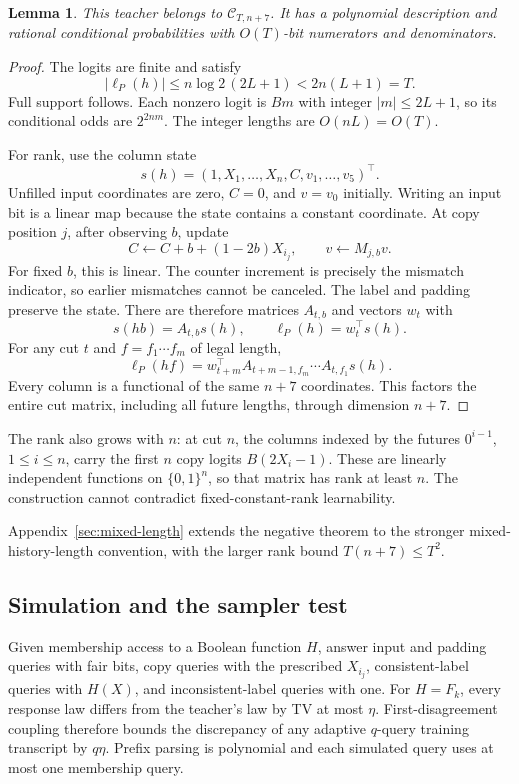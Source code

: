 \documentclass[11pt]{article}
\newtheorem{lemma}[theorem]{Lemma}
\theoremstyle{definition}
\theoremstyle{remark}
\begin{document}
\begin{lemma}\label{lem:hard-teacher}
This teacher belongs to $\mathcal C_{T,n+7}$. It has a polynomial description and rational conditional probabilities with $O(T)$-bit numerators and denominators.
\end{lemma}
\begin{proof}
The logits are finite and satisfy
\[
|\ell_P(h)|\le n\log2\,(2L+1)<2n(L+1)=T.
\]
Full support follows. Each nonzero logit is $Bm$ with integer $|m|\le2L+1$, so its conditional odds are $2^{2nm}$. The integer lengths are $O(nL)=O(T)$.

For rank, use the column state
\[
s(h)=(1,X_1,\ldots,X_n,C,v_1,\ldots,v_5)^\top.
\]
Unfilled input coordinates are zero, $C=0$, and $v=v_0$ initially. Writing an input bit is a linear map because the state contains a constant coordinate. At copy position $j$, after observing $b$, update
\begin{equation}\label{eq:counter}
C\leftarrow C+b+(1-2b)X_{i_j},
\qquad v\leftarrow M_{j,b}v.
\end{equation}
For fixed $b$, this is linear. The counter increment is precisely the mismatch indicator, so earlier mismatches cannot be canceled. The label and padding preserve the state. There are therefore matrices $A_{t,b}$ and vectors $w_t$ with
\[
s(hb)=A_{t,b}s(h),\qquad \ell_P(h)=w_t^\top s(h).
\]
For any cut $t$ and $f=f_1\cdots f_m$ of legal length,
\[
\ell_P(hf)=w_{t+m}^\top A_{t+m-1,f_m}\cdots A_{t,f_1}s(h).
\]
Every column is a functional of the same $n+7$ coordinates. This factors the entire cut matrix, including all future lengths, through dimension $n+7$.
\end{proof}

The rank also grows with $n$: at cut $n$, the columns indexed by the futures $0^{i-1}$, $1\le i\le n$, carry the first $n$ copy logits $B(2X_i-1)$. These are linearly independent functions on $\{0,1\}^n$, so that matrix has rank at least $n$. The construction cannot contradict fixed-constant-rank learnability.

Appendix~\ref{sec:mixed-length} extends the negative theorem to the stronger mixed-history-length convention, with the larger rank bound $T(n+7)\le T^2$.

\subsection{Simulation and the sampler test}

Given membership access to a Boolean function $H$, answer input and padding queries with fair bits, copy queries with the prescribed $X_{i_j}$, consistent-label queries with $H(X)$, and inconsistent-label queries with one. For $H=F_k$, every response law differs from the teacher's law by TV at most $\eta$. First-disagreement coupling therefore bounds the discrepancy of any adaptive $q$-query training transcript by $q\eta$. Prefix parsing is polynomial and each simulated query uses at most one membership query.
\end{document}
